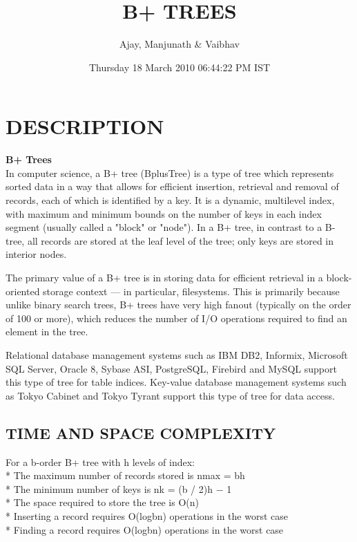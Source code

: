 \documentclass{article}
\begin{document}
\title{B+ TREES}
\author{Ajay, Manjunath & Vaibhav }
\date{Thursday 18 March 2010 06:44:22 PM IST }
\maketitle

\section{DESCRIPTION}
\textbf{B+ Trees} \\
In computer science, a B+ tree (BplusTree) is a type of tree which represents sorted data in a way that allows for efficient insertion, retrieval and removal of records, each of which is identified by a key. It is a dynamic, multilevel index, with maximum and minimum bounds on the number of keys in each index segment (usually called a "block" or "node"). In a B+ tree, in contrast to a B-tree, all records are stored at the leaf level of the tree; only keys are stored in interior nodes.

The primary value of a B+ tree is in storing data for efficient retrieval in a block-oriented storage context — in particular, filesystems. This is primarily because unlike binary search trees, B+ trees have very high fanout (typically on the order of 100 or more), which reduces the number of I/O operations required to find an element in the tree.

Relational database management systems such as IBM DB2, Informix, Microsoft SQL Server, Oracle 8, Sybase ASI, PostgreSQL, Firebird and MySQL support this type of tree for table indices. Key-value database management systems such as Tokyo Cabinet and Tokyo Tyrant support this type of tree for data access. \\


\subsection{TIME AND SPACE COMPLEXITY}
For a b-order B+ tree with h levels of index:\\ 
    * The maximum number of records stored is nmax = bh\\
    * The minimum number of keys is nk = (b / 2)h − 1\\
    * The space required to store the tree is O(n)\\
    * Inserting a record requires O(logbn) operations in the worst case\\
    * Finding a record requires O(logbn) operations in the worst case\\
\pagebreak
\end{document}
